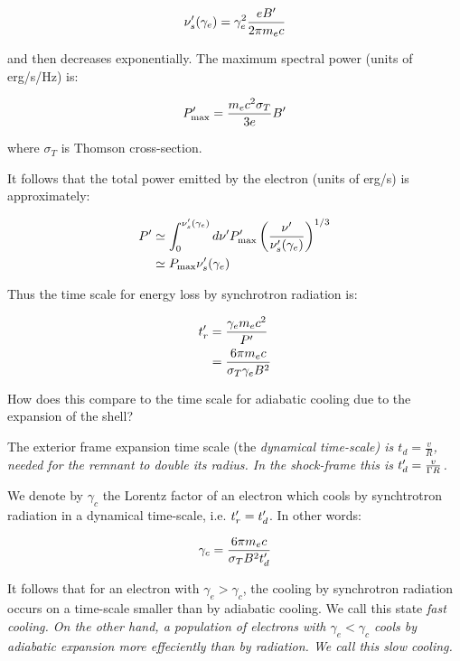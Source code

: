 \begin{equation}
    \nu_s^{\prime}(\gamma_e) = \gamma_e^2 \frac{eB^{\prime}}{2\pi m_e c}
\end{equation}

and then decreases exponentially. The maximum spectral power (units of erg/s/Hz) is:

\begin{equation}\label{pmax}
    P_{\mathrm{max}}^{\prime} = \frac{m_e c^2 \sigma_T}{3e}B^{\prime}
\end{equation}

where $\sigma_T$ is Thomson cross-section.

It follows that the total power emitted by the electron (units of erg/s) is approximately:

\begin{align}
    P^{\prime} &\simeq \int_0^{\nu_s^{\prime}(\gamma_e)} d\nu^{\prime} P_{\mathrm{max}}^{\prime} \left(\frac{\nu^{\prime}}{\nu_s^{\prime}(\gamma_e)}\right)^{1/3} \\
        &\simeq P_{\mathrm{max}} \nu_s^{\prime}(\gamma_e)
\end{align}

Thus the time scale for energy loss by synchrotron radiation is:

\begin{align}
    t_r^{\prime} &= \frac{\gamma_e m_e c^2}{P^{\prime}} \\
          &= \frac{6\pi m_e c}{\sigma_T \gamma_e B^2}
\end{align}

How does this compare to the time scale for adiabatic cooling due to the expansion of the shell?

The exterior frame expansion time scale (the \it{dynamical} time-scale) is $t_d = \frac{v}{R}$, needed for the remnant to double its radius. In the shock-frame this is $t_d^{\prime} = \frac{v}{\Gamma R}$.

We denote by $\gamma_c$ the Lorentz factor of an electron which cools by synchtrotron radiation in a dynamical time-scale, i.e. $t_r^{\prime} = t_d^{\prime}$. In other words:

\begin{equation} \gamma_c = \frac{6 \pi m_e c}{\sigma_T B^2 t_d^{\prime}}\end{equation}

It follows that for an electron with $\gamma_e > \gamma_c$, the cooling by synchrotron radiation occurs on a time-scale smaller than by adiabatic cooling. We call this state \it{fast cooling}. On the other hand, a population of electrons with $\gamma_e < \gamma_c$ cools by adiabatic expansion more effeciently than by radiation. We call this \it{slow cooling}.

